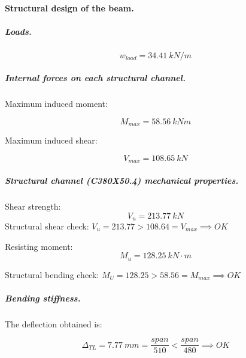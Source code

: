 \paragraph{Structural design of the beam.}

\subparagraph{Loads.}

\begin{equation}
  w_{load}= 34.41\ kN/m
\end{equation}

\subparagraph{Internal forces on each structural channel.}

\noindent Maximum induced moment:

\begin{equation}
  M_{max}= 58.56\ kN m
\end{equation}

\noindent Maximum induced shear:

\begin{equation}
  V_{max}= 108.65\ kN
\end{equation}

\subparagraph{Structural channel (C380X50.4) mechanical properties.}

\noindent Shear strength:
\begin{equation}
  V_u= 213.77\ kN 
\end{equation}
\noindent Structural shear check: $V_u = 213.77 > 108.64 = V_{max} \implies OK$

\noindent Resisting moment:
\begin{equation}
  M_u= 128.25\ kN\cdot m
\end{equation}

\noindent Structural bending check: $M_U = 128.25 > 58.56 = M_{max} \implies OK$

\subparagraph{Bending stiffness.}
The deflection obtained is:

\begin{equation}
  \Delta_{TL}= 7.77\ mm= \frac{span}{510} < \frac{span}{480} \implies OK
\end{equation}

